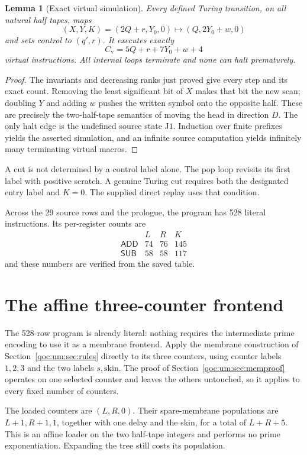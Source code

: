 \documentclass[11pt,letterpaper]{article}
\newtheorem{lemma}[theorem]{Lemma}
\theoremstyle{definition}
\theoremstyle{remark}
\newcommand{\ADD}{\mathsf{ADD}}
\newcommand{\SUB}{\mathsf{SUB}}
\newcommand{\skin}{\mathrm{skin}}
\begin{document}
\begin{lemma}[Exact virtual simulation]\label{qoc:um:lem:virtual}
Every defined Turing transition, on all natural half tapes, maps
\[
 (X,Y,K)=(2Q+r,Y_0,0)\longmapsto(Q,2Y_0+w,0)
\]
and sets control to $(q',r)$. It executes exactly
\[
 C_{\mathrm v}=5Q+r+7Y_0+w+4
\]
virtual instructions. All internal loops terminate and none can halt prematurely.
\end{lemma}
\begin{proof}
The invariants and decreasing ranks just proved give every step and its exact count. Removing the least significant bit of $X$ makes that bit the new scan; doubling $Y$ and adding $w$ pushes the written symbol onto the opposite half. These are precisely the two-half-tape semantics of moving the head in direction $D$. The only halt edge is the undefined source state $\mathrm J1$. Induction over finite prefixes yields the asserted simulation, and an infinite source computation yields infinitely many terminating virtual macros.
\end{proof}

A cut is not determined by a control label alone. The pop loop revisits its first label with positive scratch. A genuine Turing cut requires both the designated entry label and $K=0$. The supplied direct replay uses that condition.

Across the 29 source rows and the prologue, the program has 528 literal instructions. Its per-register counts are
\[
\begin{array}{c|rrr}
 &L&R&K\\\hline
\ADD&74&76&145\\
\SUB&58&58&117
\end{array}
\]
and these numbers are verified from the saved table.

\section{The affine three-counter frontend}\label{qoc:um:sec:direct}
The 528-row program is already literal: nothing requires the intermediate prime encoding to use it as a membrane frontend. Apply the membrane construction of Section~\ref{qoc:um:sec:rules} directly to its three counters, using counter labels $1,2,3$ and the two labels $s,\skin$. The proof of Section~\ref{qoc:um:sec:memproof} operates on one selected counter and leaves the others untouched, so it applies to every fixed number of counters.

The loaded counters are $(L,R,0)$. Their spare-membrane populations are $L+1,R+1,1$, together with one delay and the skin, for a total of $L+R+5$. This is an affine loader on the two half-tape integers and performs no prime exponentiation. Expanding the tree still costs its population.
\end{document}
